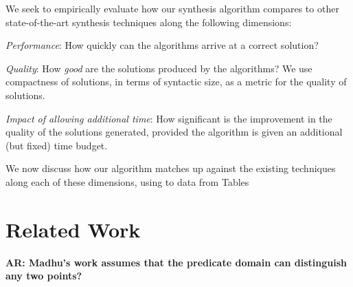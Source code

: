 \documentclass{llncs}
\newcommand\arsays[1]{{\bf AR: #1}}
\begin{document}
We seek to empirically evaluate how our synthesis algorithm compares
to other state-of-the-art synthesis techniques along the following
dimensions:
\begin{inparaenum}[(a)]
\item
\emph{Performance}: How quickly can the algorithms arrive at a correct
solution?
\item
\emph{Quality}: How \emph{good} are the solutions produced by the
algorithms? We use compactness of solutions, in terms of syntactic
size, as a metric for the quality of solutions.
\item
\emph{Impact of allowing additional time}: How significant is the
improvement in the quality of the solutions generated, provided the
algorithm is given an additional (but fixed) time budget.
\end{inparaenum}
We now discuss how our algorithm matches up against the existing
techniques along each of these dimensions, using to data from Tables


\section{Related Work}
\label{sec:related_work}


\setlength{\bibsep}{1pt}
\begin{small}

\end{small}

\arsays{Madhu's work assumes that the predicate domain can distinguish
any two points?}
\end{document}
